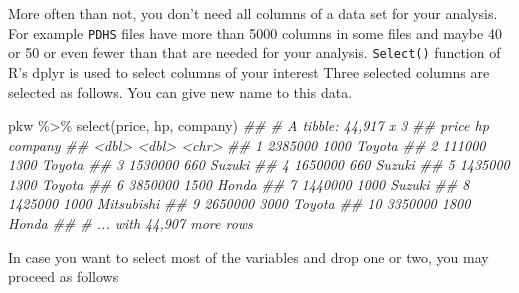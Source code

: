 \documentclass[
  letterpaper,
  DIV=11,
  numbers=noendperiod]{scrartcl}
\newenvironment{Shaded}{\begin{snugshade}}{\end{snugshade}}
\newcommand{\DocumentationTok}[1]{\textcolor[rgb]{0.37,0.37,0.37}{\textit{#1}}}
\newcommand{\FunctionTok}[1]{\textcolor[rgb]{0.28,0.35,0.67}{#1}}
\newcommand{\NormalTok}[1]{\textcolor[rgb]{0.00,0.23,0.31}{#1}}
\newcommand{\SpecialCharTok}[1]{\textcolor[rgb]{0.37,0.37,0.37}{#1}}
\begin{document}
More often than not, you don't need all columns of a data set for your
analysis. For example \texttt{PDHS} files have more than 5000 columns in
some files and maybe 40 or 50 or even fewer than that are needed for
your analysis. \texttt{Select()} function of R's dplyr is used to select
columns of your interest Three selected columns are selected as follows.
You can give new name to this data.

\begin{Shaded}
\begin{Highlighting}[]
\NormalTok{pkw }\SpecialCharTok{\%\textgreater{}\%} \FunctionTok{select}\NormalTok{(price, hp, company)}
\DocumentationTok{\#\# \# A tibble: 44,917 x 3}
\DocumentationTok{\#\#      price    hp company   }
\DocumentationTok{\#\#      \textless{}dbl\textgreater{} \textless{}dbl\textgreater{} \textless{}chr\textgreater{}     }
\DocumentationTok{\#\#  1 2385000  1000 Toyota    }
\DocumentationTok{\#\#  2  111000  1300 Toyota    }
\DocumentationTok{\#\#  3 1530000   660 Suzuki    }
\DocumentationTok{\#\#  4 1650000   660 Suzuki    }
\DocumentationTok{\#\#  5 1435000  1300 Toyota    }
\DocumentationTok{\#\#  6 3850000  1500 Honda     }
\DocumentationTok{\#\#  7 1440000  1000 Suzuki    }
\DocumentationTok{\#\#  8 1425000  1000 Mitsubishi}
\DocumentationTok{\#\#  9 2650000  3000 Toyota    }
\DocumentationTok{\#\# 10 3350000  1800 Honda     }
\DocumentationTok{\#\# \# ... with 44,907 more rows}
\end{Highlighting}
\end{Shaded}

In case you want to select most of the variables and drop one or two,
you may proceed as follows
\end{document}
